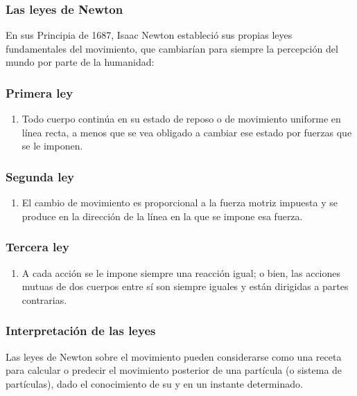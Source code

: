 \documentclass[12pt]{beamer}
\begin{document}
\begin{frame}
\frametitle{Las leyes de Newton}
En sus Principia de 1687, Isaac Newton estableció sus propias leyes fundamentales del movimiento, que cambiarían para siempre la percepción del mundo por parte de la humanidad:
\end{frame}
\begin{frame}
\frametitle{Primera ley}
\begin{enumerate}[label=\Roman*.]
\item Todo cuerpo continúa en su estado de reposo o de movimiento uniforme en línea recta, a menos que se vea obligado a cambiar ese estado por fuerzas que se le imponen.
\seti
\end{enumerate}
\end{frame}
\begin{frame}
\frametitle{Segunda ley}
\begin{enumerate}[label=\Roman*.]
\conti
\item El cambio de movimiento es proporcional a la fuerza motriz impuesta y se produce en la dirección de la línea en la que se impone esa fuerza.
\seti
\end{enumerate}
\end{frame}
\begin{frame}
\frametitle{Tercera ley}
\begin{enumerate}[label=\Roman*.]
\conti
\item A cada acción se le impone siempre una reacción igual; o bien, las acciones mutuas de dos cuerpos entre sí son siempre iguales y están dirigidas a partes contrarias.
\end{enumerate}
\end{frame}
\begin{frame}
\frametitle{Interpretación de las leyes}
Las leyes de Newton sobre el movimiento pueden considerarse como una receta para calcular o predecir el movimiento posterior de una partícula (o sistema de partículas), dado el conocimiento de su  y  en un instante determinado.
\end{frame}
\end{document}

